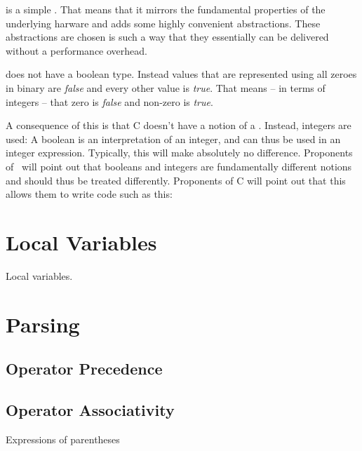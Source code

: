 

 is a simple . That means that it mirrors the fundamental properties of the underlying harware and adds some highly convenient abstractions. These abstractions are chosen is such a way that they essentially can be delivered without a performance overhead.

 does not have a boolean type. Instead  values that are represented using all zeroes in binary are \textsl{false} and every other value is \textsl{true}. That means -- in terms of integers -- that zero is \textsl{false} and non-zero is \textsl{true}. %

A consequence of this is that C doesn't have a notion of a . Instead, integers are used: A boolean is an interpretation of an integer, and can thus be used in an integer expression. Typically, this will make absolutely no difference. Proponents of \csharp\ will point out that booleans and integers are fundamentally different notions and should thus be treated differently. Proponents of C will point out that this allows them to write code such as this:



\section{Local Variables}
\csharpsubsection{\csharp}

\begin{syntaxfloat}
  
  \caption{Local variables.}
  \label{syntax:prim:vars:locals}
\end{syntaxfloat}


\section{Parsing}
\subsection{Operator Precedence}


\subsection{Operator Associativity}

\csharpsubsection{\csharp}

\begin{syntaxfloat}
  
  \caption{Expressions of parentheses}
  \label{syntax:prim:pars}
\end{syntaxfloat}


